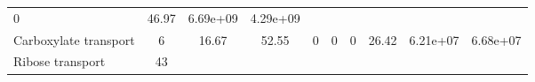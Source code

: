 \documentclass[]{article}
\begin{document}
\begin{longtable}[]{@{}lccccccccc@{}}
\begin{minipage}[t]{0.08\columnwidth}
0\strut
\end{minipage} & \begin{minipage}[t]{0.08\columnwidth}\centering\strut
46.97\strut
\end{minipage} & \begin{minipage}[t]{0.08\columnwidth}\centering\strut
6.69e+09\strut
\end{minipage} & \begin{minipage}[t]{0.08\columnwidth}\centering\strut
4.29e+09\strut
\end{minipage}\tabularnewline
\begin{minipage}[t]{0.07\columnwidth}\raggedright\strut
Carboxylate transport\strut
\end{minipage} & \begin{minipage}[t]{0.06\columnwidth}\centering\strut
6\strut
\end{minipage} & \begin{minipage}[t]{0.08\columnwidth}\centering\strut
16.67\strut
\end{minipage} & \begin{minipage}[t]{0.08\columnwidth}\centering\strut
52.55\strut
\end{minipage} & \begin{minipage}[t]{0.08\columnwidth}\centering\strut
0\strut
\end{minipage} & \begin{minipage}[t]{0.08\columnwidth}\centering\strut
0\strut
\end{minipage} & \begin{minipage}[t]{0.08\columnwidth}\centering\strut
0\strut
\end{minipage} & \begin{minipage}[t]{0.08\columnwidth}\centering\strut
26.42\strut
\end{minipage} & \begin{minipage}[t]{0.08\columnwidth}\centering\strut
6.21e+07\strut
\end{minipage} & \begin{minipage}[t]{0.08\columnwidth}\centering\strut
6.68e+07\strut
\end{minipage}\tabularnewline
\begin{minipage}[t]{0.07\columnwidth}\raggedright\strut
Ribose transport\strut
\end{minipage} & \begin{minipage}[t]{0.06\columnwidth}\centering\strut
43\strut
\end{minipage} & \begin{minipage}[t]{0.08\columnwidth}\centering\strut

\end{minipage}
\end{longtable}
\end{document}

